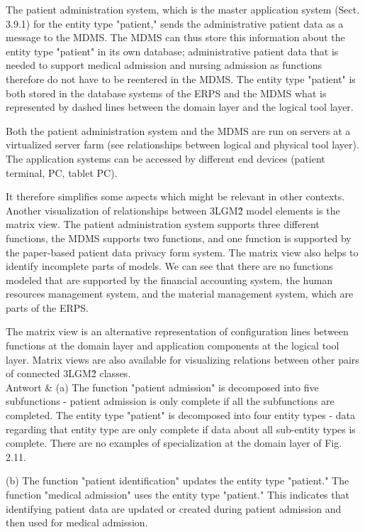 The patient administration system, which is the master application system (Sect. 3.9.1) for the entity type "patient," sends the administrative patient data as a message to the MDMS.
The MDMS can thus store this information about the entity type "patient" in its own database; administrative patient data that is needed to support medical admission and nursing admission as functions therefore do not have to be reentered in the MDMS.
The entity type "patient" is both stored in the database systems of the ERPS and the MDMS what is represented by dashed lines between the domain layer and the logical tool layer.

Both the patient administration system and the MDMS are run on servers at a virtualized server farm (see relationships between logical and physical tool layer). The application systems can be accessed by different end devices (patient terminal, PC, tablet PC).

It therefore simplifies some aspects which might be relevant in other contexts.
Another visualization of relationships between 3LGM\^2 model elements is the matrix view.
The patient administration system supports three different functions, the MDMS supports two functions, and one function is supported by the paper-based patient data privacy form system.
The matrix view also helps to identify incomplete parts of models.
We can see that there are no functions modeled that are supported by the financial accounting system, the human resources management system, and the material management system, which are parts of the ERPS.

The matrix view is an alternative representation of configuration lines between functions at the domain layer and application components at the logical tool layer. Matrix views are also available for visualizing relations between other pairs of connected 3LGM\^2 classes. \\
Antwort & (a) The function "patient admission" is decomposed into five subfunctions - patient admission is only complete if all the subfunctions are completed. The entity type "patient" is decomposed into four entity types - data regarding that entity type are only complete if data about all sub-entity types is complete. There are no examples of specialization at the domain layer of Fig. 2.11.

(b) The function "patient identification" updates the entity type "patient." The function "medical admission" uses the entity type "patient." This indicates that identifying patient data are updated or created during patient admission and then used for medical admission.
 
